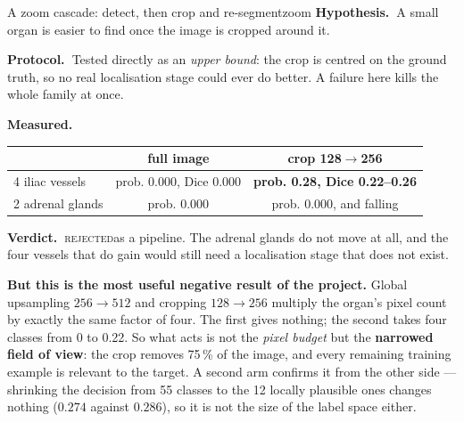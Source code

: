 \documentclass{article}
\newcommand{\hyp}{\textbf{Hypothesis.\ }}
\newcommand{\proto}{\textbf{Protocol.\ }}
\newcommand{\meas}{\textbf{Measured.\ }}
\newcommand{\verd}{\textbf{Verdict.\ }}
\newcommand{\rejected}{\textcolor{myred}{\textsc{rejected}}}
\begin{document}
\begin{expfail}{A zoom cascade: detect, then crop and re-segment}{zoom}
\hyp A small organ is easier to find once the image is cropped around it.

\proto Tested directly as an \emph{upper bound}: the crop is centred on the ground
truth, so no real localisation stage could ever do better. A failure here kills
the whole family at once.

\meas
\begin{center}
\begin{tabular}{lcc}
\hline
 & \textbf{full image} & \textbf{crop 128$\to$256} \\
\hline
4 iliac vessels & prob. 0.000, Dice 0.000 & \textbf{prob. 0.28, Dice 0.22--0.26} \\
2 adrenal glands & prob. 0.000 & prob. 0.000, and falling \\
\hline
\end{tabular}
\end{center}

\verd \rejected as a pipeline. The adrenal glands do not move at all, and the four
vessels that do gain would still need a localisation stage that does not exist.

\vspace{2.0mm}
\noindent\textbf{But this is the most useful negative result of the project.}
Global upsampling $256 \to 512$ and cropping $128 \to 256$ multiply the organ's
pixel count by exactly the same factor of four. The first gives nothing; the
second takes four classes from 0 to 0.22. So what acts is not the \emph{pixel
budget} but the \textbf{narrowed field of view}: the crop removes 75\,\% of the
image, and every remaining training example is relevant to the target. A second
arm confirms it from the other side --- shrinking the decision from 55 classes to
the 12 locally plausible ones changes nothing ($0.274$ against $0.286$), so it is
not the size of the label space either.
\end{expfail}
\end{document}
